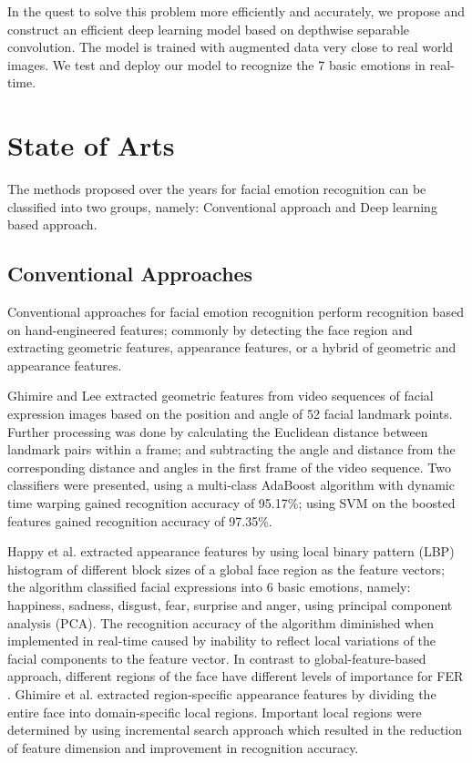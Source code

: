 \documentclass[master]{thesis-uestc}
\begin{document}
In the quest to solve this problem more efficiently and accurately, we propose and construct an efficient deep learning model based on depthwise separable convolution. The model is trained with augmented data very close to real world images. We test and deploy our model to recognize the 7 basic emotions in real-time.

\section{State of Arts}
The methods proposed over the years for facial emotion recognition can be classified into two groups, namely: Conventional approach and Deep learning based approach.

\subsection{Conventional Approaches}
Conventional approaches for facial emotion recognition perform recognition based on hand-engineered features; commonly by detecting the face region and extracting geometric features, appearance features, or a hybrid of geometric and appearance features.

Ghimire and Lee\cite{ghimire2013} extracted geometric features from video sequences of facial expression images based on the position and angle of 52 facial landmark points. Further processing was done by calculating the Euclidean distance between landmark pairs within a frame; and subtracting the angle and distance from the corresponding distance and angles in the first frame of the video sequence. Two classifiers were presented, using a multi-class AdaBoost algorithm with dynamic time warping gained recognition accuracy of 95.17\%; using SVM on the boosted features gained recognition accuracy of 97.35\%.

Happy et al.\cite{Happy-2017} extracted appearance features by using local binary pattern (LBP) histogram of different block sizes of a global face region as the feature vectors; the algorithm classified facial expressions into 6 basic emotions, namely: happiness, sadness, disgust, fear, surprise and anger, using principal component analysis (PCA). The recognition accuracy of the algorithm diminished when implemented in real-time caused by inability to reflect local variations of the facial components to the feature vector. In contrast to global-feature-based approach, different regions of the face have different levels of importance for FER \cite{josh2018}.  Ghimire et al.\cite{ghimire2013} extracted region-specific appearance features by dividing the entire face into domain-specific local regions. Important local regions were determined by using incremental search approach which resulted in the reduction of feature dimension and improvement in recognition accuracy.
\end{document}
